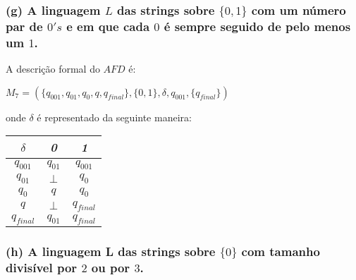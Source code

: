 \documentclass{article}
\begin{document}
\subsubsection*{(g) A linguagem $L$ das strings sobre $\{0, 1\}$ com um número par de $0's$ e em que cada $0$ é sempre seguido de pelo menos um $1$.}

\begin{center}
\end{center}

A descrição formal do $AFD$ é:
\begin{center}
  $M_7 = (\{q_{001},q_{01},q_{0},q,q_{final}\}, \{0,1\},\delta,q_{001}, \{q_{final}\})$
\end{center}
onde $\delta$ é representado da seguinte maneira:

\begin{table}[htbp]
  \centering
  \begin{tabular}{c|cc}
    \textit{$\delta$}  & \textit{0}        & \textit{1}         \\ \hline
    \textit{$q_{001}$} & \textit{$q_{01}$} & \textit{$q_{001}$} \\
    \textit{$q_{01}$}  & \textit{$\perp$}  & \textit{$q_{0}$}   \\
    \textit{$q_{0}$}   & \textit{$q$}      & \textit{$q_{0}$}   \\
    $q$                & $\perp$           & $q_{final}$        \\
    $q_{final}$        & $q_{01}$          & $q_{final}$
  \end{tabular}
\end{table}

\pagebreak

\subsubsection*{(h) A linguagem L das strings sobre $\{0\}$ com tamanho divisível por $2$ ou por $3$.}
\end{document}
